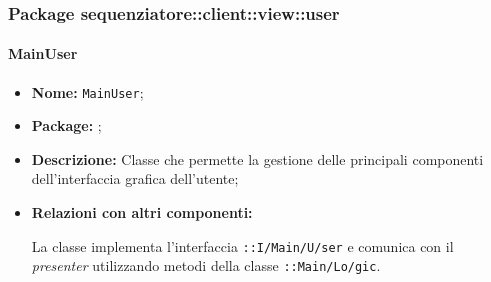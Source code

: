 \subsubsection{Package sequenziatore::client::view::user}

\paragraph{MainUser}
\begin{flushleft}
\begin{itemize}
\item \textbf{Nome:} \texttt{MainUser};
\item \textbf{Package:} \texttt{\viewUser{}};
\item \textbf{Descrizione:} Classe che permette la gestione delle principali componenti dell'interfaccia grafica dell'utente;
\item \textbf{Relazioni con altri componenti:}
\begin{sloppypar}
La classe implementa l'interfaccia \texttt{\iViewUser{}::I\fshyp{}Main\fshyp{}U\fshyp{}ser} e comunica con il \textit{presenter} utilizzando metodi della classe \texttt{\logicUser{}::Main\fshyp{}Lo\fshyp{}gic}.
\end{sloppypar}
\end{itemize}
\end{flushleft}

